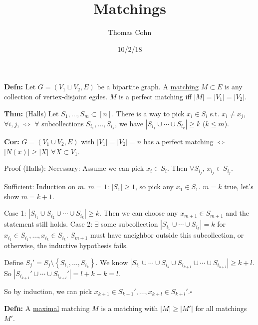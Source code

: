 \documentclass[10pt,letterpaper]{article}
\author{Thomas Cohn}
\title{Matchings}
\date{10/2/18} %
\newcommand{\n}{\hfill\break}
\newcommand{\defn}[1]{\par\noindent\settowidth{\hangindent}{\textbf{Defn: }}\textbf{Defn: }#1\n}
\newcommand{\thm}[1]{\par\noindent\settowidth{\hangindent}{\textbf{Thm: }}\textbf{Thm: }#1\n}
\newcommand{\cor}[1]{\par\noindent\settowidth{\hangindent}{\textbf{Cor: }}\textbf{Cor: }#1\n}
\newcommand{\proven}{\;$\square$\n}
\newcommand{\card}[1]{\left|#1\right|}
\newcommand{\set}[1]{\left\{#1\right\}}
\newcommand{\st}{s.t.}
\begin{document}
\maketitle
\setlength\RaggedRightParindent{\parindent}
\RaggedRight

\defn{Let $G=(V_{1}\sqcup{}V_{2},E)$ be a bipartite graph. A \underline{matching} $M\subset{}E$ is any collection of vertex-disjoint egdes. $M$ is a perfect matching iff $\card{M}=\card{V_{1}}=\card{V_{2}}$.}

\thm{(Halls) Let $S_{1},\ldots,S_{m}\subset[n]$. There is a way to pick $x_{i}\in{}S_{i}$ \st{} $x_{i}\ne{}x_{j}$, $\forall{}i,j$, $\Leftrightarrow$ $\forall$ subcollections $S_{i_{1}},\ldots,S_{i_{k}}$, we have $\card{S_{i_{1}}\cup\cdots\cup{}S_{i_{k}}}\ge{}k$ ($k\le{}m$).}

\cor{$G=(V_{1}\cup{}V_{2},E)$ with $\card{V_{1}}=\card{V_{2}}=n$ has a perfect matching $\Leftrightarrow$ $\card{N(x)}\ge\card{X}$ $\forall{}X\subset{}V_{1}$.}

\par\noindent Proof (Halls):\n
Necessary: Assume we can pick $x_{i}\in{}S_{i}$. Then $\forall{}S_{i_{j}}$, $x_{i_{j}}\in{}S_{i_{j}}$.\n

\par\noindent Sufficient: Induction on $m$.\n
$m=1$: $\card{S_{1}}\ge{}1$, so pick any $x_{1}\in{}S_{1}$.\n
$m=k$ true, let's show $m=k+1$.\n

\par\noindent Case 1: $\card{S_{i_{1}}\cup{}S_{i_{2}}\cup\cdots\cup{}S_{i_{k}}}\ge{}k$. Then we can choose any $x_{m+1}\in{}S_{m+1}$ and the statement still holds.\n
Case 2: $\exists$ some subcollection $\card{S_{i_{1}}\cup\cdots\cup{}S_{i_{k}}}=k$ for $x_{i_{1}}\in{}S_{i_{1}},\ldots,x_{i_{k}}\in{}S_{i_{k}}$. $S_{m+1}$ must have  aneighbor outside this subcollection, or otherwise, the inductive hypothesis fails.\n

\par\noindent Define $S_{j}'=S_{j}\setminus\set{S_{i_{1}},\ldots,S_{i_{k}}}$. We know $\card{S_{i_{1}}\cup\cdots\cup{}S_{i_{k}}\cup{}S_{i_{k+1}}\cup\cdots\cup{}S_{i_{k+l}}}\ge{}k+l$. So $\card{S_{i_{k+1}}'\cup\cdots\cup{}S_{i_{k+l}}'}=l+k-k=l$.\n

\par\noindent So by induction, we can pick $x_{k+1}\in{}S_{k+1}',\ldots,x_{k+l}\in{}S_{k+l}'$.\proven

\defn{A \underline{maximal} matching $M$ is a matching with $\card{M}\ge\card{M'}$ for all matchings $M'$.}
\end{document}
